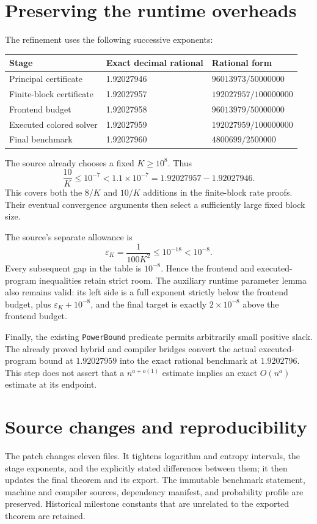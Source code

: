\documentclass[11pt,a4paper]{article}
\begin{document}
\section{Preserving the runtime overheads}
The refinement uses the following successive exponents:
\begin{center}
\begin{tabular}{@{}lll@{}}
\toprule Stage & Exact decimal rational & Rational form\\\midrule
Principal certificate & 1.92027946 & $96013973/50000000$\\
Finite-block certificate & 1.92027957 & $192027957/100000000$\\
Frontend budget & 1.92027958 & $96013979/50000000$\\
Executed colored solver & 1.92027959 & $192027959/100000000$\\
Final benchmark & 1.92027960 & $4800699/2500000$\\\bottomrule
\end{tabular}
\end{center}
The source already chooses a fixed $K\geq10^8$. Thus
\[
 \frac{10}{K}\leq10^{-7}<1.1\times10^{-7}
     =1.92027957-1.92027946.
\]
This covers both the $8/K$ and $10/K$ additions in the finite-block rate
proofs. Their eventual convergence arguments then select a sufficiently
large fixed block size.

The source's separate allowance is
\[
 \varepsilon_K=\frac1{100K^2}\leq10^{-18}<10^{-8}.
\]
Every subsequent gap in the table is $10^{-8}$. Hence the frontend and
executed-program inequalities retain strict room. The auxiliary runtime
parameter lemma also remains valid: its left side is a full exponent
strictly below the frontend budget, plus $\varepsilon_K+10^{-8}$, and
the final target is exactly $2\times10^{-8}$ above the frontend budget.

Finally, the existing \texttt{PowerBound} predicate permits arbitrarily
small positive slack. The already proved hybrid and compiler bridges
convert the actual executed-program bound at $1.92027959$ into the exact
rational benchmark at $1.9202796$. This step does not assert that a
$n^{a+o(1)}$ estimate implies an exact $O(n^a)$ estimate at its endpoint.

\section{Source changes and reproducibility}
The patch changes eleven files. It tightens logarithm and entropy intervals,
the stage exponents, and the explicitly stated differences between them;
it then updates the final theorem and its export. The immutable benchmark
statement, machine and compiler sources, dependency manifest, and
probability profile are preserved. Historical milestone constants that
are unrelated to the exported theorem are retained.
\end{document}
